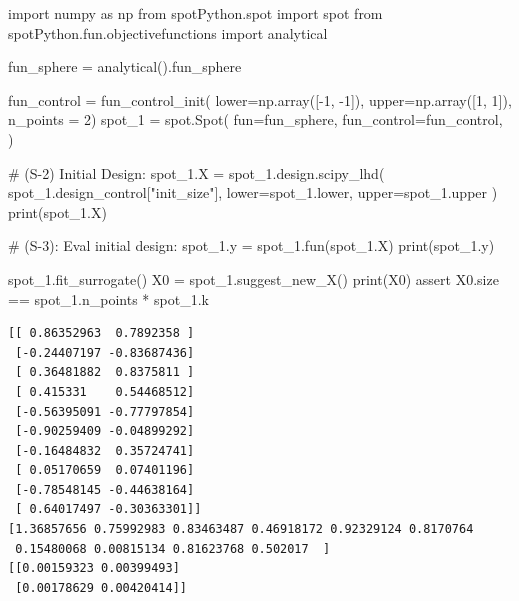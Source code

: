 \documentclass[
  letterpaper,
  DIV=11,
  numbers=noendperiod]{scrreprt}
\newenvironment{Shaded}{\begin{snugshade}}{\end{snugshade}}
\newcommand{\BuiltInTok}[1]{\textcolor[rgb]{0.00,0.23,0.31}{#1}}
\newcommand{\CommentTok}[1]{\textcolor[rgb]{0.37,0.37,0.37}{#1}}
\newcommand{\ControlFlowTok}[1]{\textcolor[rgb]{0.00,0.23,0.31}{#1}}
\newcommand{\DecValTok}[1]{\textcolor[rgb]{0.68,0.00,0.00}{#1}}
\newcommand{\ImportTok}[1]{\textcolor[rgb]{0.00,0.46,0.62}{#1}}
\newcommand{\NormalTok}[1]{\textcolor[rgb]{0.00,0.23,0.31}{#1}}
\newcommand{\OperatorTok}[1]{\textcolor[rgb]{0.37,0.37,0.37}{#1}}
\newcommand{\StringTok}[1]{\textcolor[rgb]{0.13,0.47,0.30}{#1}}
\begin{document}
\begin{Shaded}
\begin{Highlighting}[]
\ImportTok{import}\NormalTok{ numpy }\ImportTok{as}\NormalTok{ np}
\ImportTok{from}\NormalTok{ spotPython.spot }\ImportTok{import}\NormalTok{ spot}
\ImportTok{from}\NormalTok{ spotPython.fun.objectivefunctions }\ImportTok{import}\NormalTok{ analytical}

\NormalTok{fun\_sphere }\OperatorTok{=}\NormalTok{ analytical().fun\_sphere}

\NormalTok{fun\_control }\OperatorTok{=}\NormalTok{ fun\_control\_init(}
\NormalTok{                    lower}\OperatorTok{=}\NormalTok{np.array([}\OperatorTok{{-}}\DecValTok{1}\NormalTok{, }\OperatorTok{{-}}\DecValTok{1}\NormalTok{]),}
\NormalTok{                    upper}\OperatorTok{=}\NormalTok{np.array([}\DecValTok{1}\NormalTok{, }\DecValTok{1}\NormalTok{]),}
\NormalTok{                    n\_points }\OperatorTok{=} \DecValTok{2}\NormalTok{)}
\NormalTok{spot\_1 }\OperatorTok{=}\NormalTok{ spot.Spot(}
\NormalTok{    fun}\OperatorTok{=}\NormalTok{fun\_sphere,}
\NormalTok{    fun\_control}\OperatorTok{=}\NormalTok{fun\_control,}
\NormalTok{)}

\CommentTok{\# (S{-}2) Initial Design:}
\NormalTok{spot\_1.X }\OperatorTok{=}\NormalTok{ spot\_1.design.scipy\_lhd(}
\NormalTok{    spot\_1.design\_control[}\StringTok{"init\_size"}\NormalTok{], lower}\OperatorTok{=}\NormalTok{spot\_1.lower, upper}\OperatorTok{=}\NormalTok{spot\_1.upper}
\NormalTok{)}
\BuiltInTok{print}\NormalTok{(spot\_1.X)}

\CommentTok{\# (S{-}3): Eval initial design:}
\NormalTok{spot\_1.y }\OperatorTok{=}\NormalTok{ spot\_1.fun(spot\_1.X)}
\BuiltInTok{print}\NormalTok{(spot\_1.y)}

\NormalTok{spot\_1.fit\_surrogate()}
\NormalTok{X0 }\OperatorTok{=}\NormalTok{ spot\_1.suggest\_new\_X()}
\BuiltInTok{print}\NormalTok{(X0)}
\ControlFlowTok{assert}\NormalTok{ X0.size }\OperatorTok{==}\NormalTok{ spot\_1.n\_points }\OperatorTok{*}\NormalTok{ spot\_1.k}
\end{Highlighting}
\end{Shaded}

\begin{verbatim}
[[ 0.86352963  0.7892358 ]
 [-0.24407197 -0.83687436]
 [ 0.36481882  0.8375811 ]
 [ 0.415331    0.54468512]
 [-0.56395091 -0.77797854]
 [-0.90259409 -0.04899292]
 [-0.16484832  0.35724741]
 [ 0.05170659  0.07401196]
 [-0.78548145 -0.44638164]
 [ 0.64017497 -0.30363301]]
[1.36857656 0.75992983 0.83463487 0.46918172 0.92329124 0.8170764
 0.15480068 0.00815134 0.81623768 0.502017  ]
[[0.00159323 0.00399493]
 [0.00178629 0.00420414]]
\end{verbatim}
\end{document}
